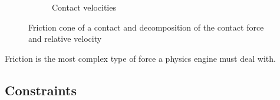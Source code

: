 \begin{figure}[htp]
\begin{subfigure}[b]{0.47\textwidth}
	\caption{Contact velocities}
	\label{fig:friction_cube}
\end{subfigure}
\caption[Friction cone and relative velocities]{Friction cone of a contact and decomposition of the contact force and relative velocity}
\label{fig:ph}
\end{figure}

Friction is the most complex type of force a physics engine must deal with. 

\subsection{Constraints}
